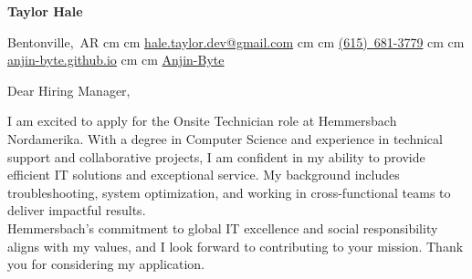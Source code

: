 \documentclass[10pt, letterpaper]{article}
\newenvironment{header}{
    \setlength{\topsep}{0pt}\par\kern\topsep\centering\color{primaryColor}\linespread{1.5}
}{
    \par\kern\topsep
} %
\newcommand{\placelastupdatedtext}{%
  \AddToShipoutPictureFG*{%
    \put(
        \LenToUnit{\paperwidth-2 cm-0.2 cm+0.05cm},
        \LenToUnit{\paperheight-1.0 cm}
    ){\vtop{{\null}\makebox[0pt][c]{
        \small\color{gray}\textit{Last updated in September 2024}\hspace{\widthof{Last updated in September 2024}}
    }}}%
  }%
}%
\let\hrefWithoutArrow\href
\renewcommand{\href}[2]{\hrefWithoutArrow{#1}{\ifthenelse{\equal{#2}{}}{ }{#2 }\raisebox{.15ex}{\footnotesize \faExternalLink*}}}
\begin{document}
    \begin{header}
        \fontsize{30 pt}{30 pt}
        \textbf{Taylor Hale}

        \vspace{0.3 cm}

        \normalsize
        \mbox{{\footnotesize\faMapMarker*}\hspace*{0.13cm}Bentonville, AR}%
         cm%
        \AND%
         cm%
        \mbox{\hrefWithoutArrow{mailto:hale.taylor.dev@gmail.com}{{\footnotesize\faEnvelope[regular]}\hspace*{0.13cm}hale.taylor.dev@gmail.com}}%
         cm%
        \AND%
         cm%
        \mbox{\hrefWithoutArrow{tel:615-681-3779}{{\footnotesize\faPhone*}\hspace*{0.13cm}(615) 681-3779}}%
         cm%
        \AND%
         cm%
        \mbox{\hrefWithoutArrow{https://anjin-byte.github.io/}{{\footnotesize\faLink}\hspace*{0.13cm}anjin-byte.github.io}}%
         cm%
        \AND%
         cm%
        \mbox{\hrefWithoutArrow{https://github.com/Anjin-Byte}{{\footnotesize\faGithub}\hspace*{0.13cm}Anjin-Byte}}%
    \end{header}

    \vspace{0.3 cm - 0.3 cm}
    \bigskip\bigskip

Dear Hiring Manager,

\bigskip

I am excited to apply for the Onsite Technician role at Hemmersbach Nordamerika. With a degree in Computer Science and experience in technical support and collaborative projects, I am confident in my ability to provide efficient IT solutions and exceptional service. My background includes troubleshooting, system optimization, and working in cross-functional teams to deliver impactful results.\\

Hemmersbach’s commitment to global IT excellence and social responsibility aligns with my values, and I look forward to contributing to your mission. Thank you for considering my application.\\
\end{document}
